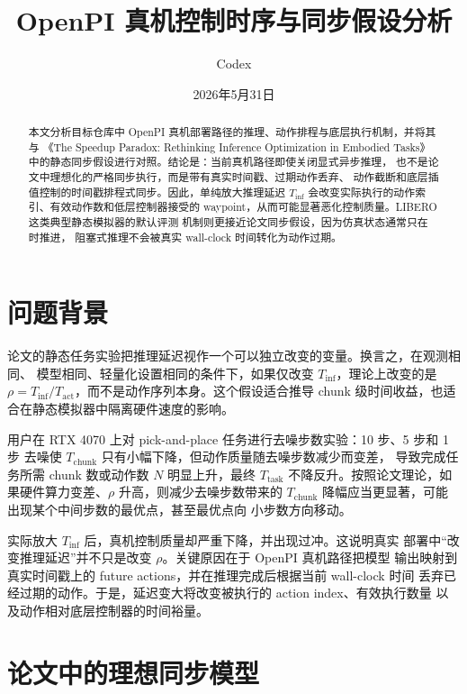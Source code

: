 \documentclass[UTF8,11pt]{ctexart}
\title{OpenPI 真机控制时序与同步假设分析}
\author{Codex}
\date{2026年5月31日}
\newcommand{\code}[1]{\texttt{\detokenize{#1}}}
\begin{document}
\maketitle

\begin{abstract}
本文分析目标仓库中 OpenPI 真机部署路径的推理、动作排程与底层执行机制，并将其与
《The Speedup Paradox: Rethinking Inference Optimization in Embodied Tasks》
中的静态同步假设进行对照。结论是：当前真机路径即使关闭显式异步推理，
也不是论文中理想化的严格同步执行，而是带有真实时间戳、过期动作丢弃、
动作截断和底层插值控制的时间戳排程式同步。因此，单纯放大推理延迟
\(T_{\mathrm{inf}}\) 会改变实际执行的动作索引、有效动作数和低层控制器接受的
waypoint，从而可能显著恶化控制质量。LIBERO 这类典型静态模拟器的默认评测
机制则更接近论文同步假设，因为仿真状态通常只在 \code{env.step} 时推进，
阻塞式推理不会被真实 wall-clock 时间转化为动作过期。
\end{abstract}

\section{问题背景}

论文的静态任务实验把推理延迟视作一个可以独立改变的变量。换言之，在观测相同、
模型相同、轻量化设置相同的条件下，如果仅改变 \(T_{\mathrm{inf}}\)，理论上改变的是
\(\rho = T_{\mathrm{inf}}/T_{\mathrm{act}}\)，而不是动作序列本身。这个假设适合推导
chunk 级时间收益，也适合在静态模拟器中隔离硬件速度的影响。

用户在 RTX 4070 上对 pick-and-place 任务进行去噪步数实验：10 步、5 步和 1 步
去噪使 \(T_{\mathrm{chunk}}\) 只有小幅下降，但动作质量随去噪步数减少而变差，
导致完成任务所需 chunk 数或动作数 \(N\) 明显上升，最终 \(T_{\mathrm{task}}\)
不降反升。按照论文理论，如果硬件算力变差、\(\rho\) 升高，则减少去噪步数带来的
\(T_{\mathrm{chunk}}\) 降幅应当更显著，可能出现某个中间步数的最优点，甚至最优点向
小步数方向移动。

实际放大 \(T_{\mathrm{inf}}\) 后，真机控制质量却严重下降，并出现过冲。这说明真实
部署中“改变推理延迟”并不只是改变 \(\rho\)。关键原因在于 OpenPI 真机路径把模型
输出映射到真实时间戳上的 future actions，并在推理完成后根据当前 wall-clock 时间
丢弃已经过期的动作。于是，延迟变大将改变被执行的 action index、有效执行数量
以及动作相对底层控制器的时间裕量。

\section{论文中的理想同步模型}
\end{document}

